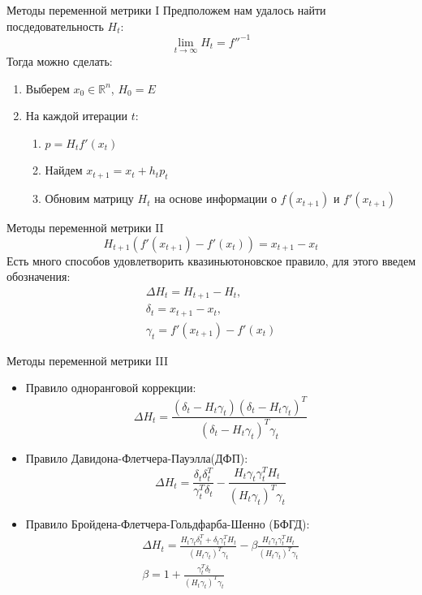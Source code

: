 \documentclass[14pt, fleqn, xcolor={dvipsnames, table}]{beamer}
\begin{document}
\begin{frame}{Методы переменной метрики I}
\small
Предположем нам удалось найти посдедовательность $H_t$:
$$\lim_{t \to \infty} H_t = f''^{-1}$$
Тогда можно сделать:
\begin{enumerate}
  \item Выберем $x_0 \in \mathbb{R}^n$, $H_0 = E$
  \item На каждой итерации $t$:
  \begin{enumerate}
    \item $p = H_t f'(x_t)$
    \item Найдем $x_{t+1} = x_t + h_t p_t$
    \item Обновим матрицу $H_t$ на основе информации о $f(x_{t+1})$ и $f'(x_{t+1})$
  \end{enumerate}
\end{enumerate}
\end{frame}

\begin{frame}{Методы переменной метрики II}
$$
H_{t+1} \left(f'(x_{t+1}) - f'(x_t)\right) = x_{t+1} - x_{t}
$$
\small
Есть много способов удовлетворить квазиньютоновское правило, для этого введем обозначения:
$$\begin{array}{l}
  \Delta H_t = H_{t+1} - H_t,\\
  \delta_t = x_{t+1} - x_t,\\
  \gamma_t = f'(x_{t+1}) - f'(x_t)
\end{array}$$
\end{frame}
\begin{frame}{Методы переменной метрики III}
\begin{itemize}
  \item Правило одноранговой коррекции:
  $$
    \Delta H_t = \frac{(\delta_t - H_t\gamma_t)(\delta_t - H_t\gamma_t)^T}{(\delta_t - H_t\gamma_t)^T\gamma_t}
  $$
  \item Правило Давидона-Флетчера-Пауэлла(ДФП):
  $$
    \Delta H_t = \frac{\delta_t\delta_{t}^{T}}{\gamma_{t}^{T}\delta_t} - \frac{H_t\gamma_t\gamma_{t}^{T}H_t}{(H_t\gamma_t)^T\gamma_t}
  $$
  \item Правило Бройдена-Флетчера-Гольдфарба-Шенно (БФГД):
  $$\begin{array}{l}
    \Delta H_t = \frac{H_t\gamma_t\delta_{t}^{T} + \delta_t\gamma_{t}^{T}H_t}{(H_t\gamma_t)^T\gamma_t} - \beta\frac{H_t\gamma_t\gamma_{t}^{T}H_t}{(H_t\gamma_t)^T\gamma_t} \\
    \beta = 1 + \frac{\gamma_{t}^{T}\delta_t}{(H_t\gamma_t)^T\gamma_t}
  \end{array}$$
\end{itemize}
\end{frame}
\end{document}

